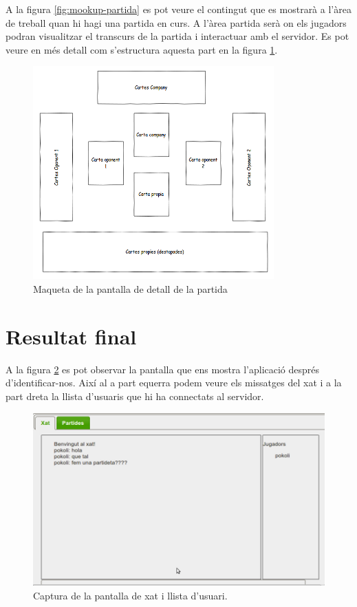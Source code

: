 A la figura \ref{fig:mookup-partida} es pot veure el contingut que es mostrarà a l'àrea de treball quan hi hagi una partida en curs. A l'àrea partida serà on els jugadors podran visualitzar el transcurs de la partida i interactuar amb el servidor. Es pot veure en més detall com s'estructura aquesta part en la figura \ref{fig:mookup-detall}.
\begin{figure}[htbp]
\centering\includegraphics{img/Detall_partida.png}
\caption{Maqueta de la pantalla de detall de la partida}
\label{fig:mookup-detall}
\end{figure} 

\section{Resultat final}

A la figura \ref{fig:real-xat} es pot observar la pantalla que ens mostra l'aplicació després d'identificar-nos. Així al a part equerra podem veure els missatges del xat i a la part dreta la llista d'usuaris que hi ha connectats al servidor. 

\begin{figure}[htbp]
\centering\includegraphics{img/real-xat.png}
\caption{Captura de la pantalla de xat i llista d'usuari.}
\label{fig:real-xat}
\end{figure} 

